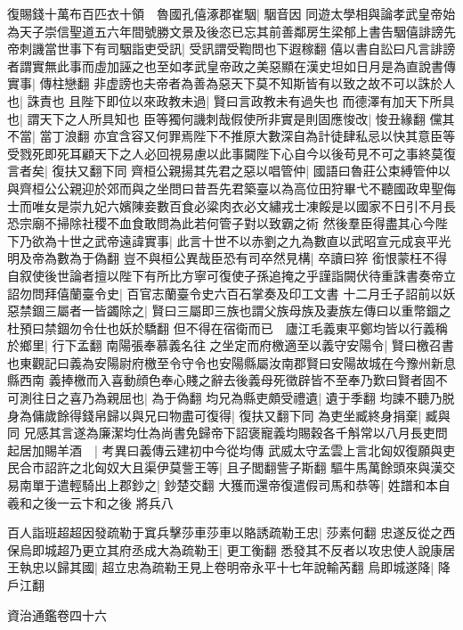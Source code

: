 復賜錢十萬布百匹衣十領　魯國孔僖涿郡崔駰|{
	駰音因}
同遊太學相與論孝武皇帝始為天子崇信聖道五六年間號勝文景及後恣已忘其前善鄰房生梁郁上書告駰僖誹謗先帝刺譏當世事下有司駰詣吏受訊|{
	受訊謂受鞫問也下遐稼翻}
僖以書自訟曰凡言誹謗者謂實無此事而虛加誣之也至如孝武皇帝政之美惡顯在漢史坦如日月是為直說書傳實事|{
	傳柱戀翻}
非虚謗也夫帝者為善為惡天下莫不知斯皆有以致之故不可以誅於人也|{
	誅責也}
且陛下即位以來政教未過|{
	賢曰言政教未有過失也}
而德澤有加天下所具也|{
	謂天下之人所具知也}
臣等獨何譏刺哉假使所非實是則固應悛改|{
	悛丑緣翻}
儻其不當|{
	當丁浪翻}
亦宜含容又何罪焉陛下不推原大數深自為計徒肆私忌以快其意臣等受戮死即死耳顧天下之人必回視易慮以此事闚陛下心自今以後苟見不可之事終莫復言者矣|{
	復扶又翻下同}
齊桓公親揚其先君之惡以唱管仲|{
	國語曰魯莊公束縛管仲以與齊桓公公親迎於郊而與之坐問曰昔吾先君築臺以為高位田狩畢弋不聽國政卑聖侮士而唯女是崇九妃六嬪陳妾數百食必粱肉衣必文繡戎士凍餒是以國家不日引不月長恐宗廟不掃除社稷不血食敢問為此若何管子對以致霸之術}
然後羣臣得盡其心今陛下乃欲為十世之武帝遠諱實事|{
	此言十世不以赤劉之九為數直以武昭宣元成哀平光明及帝為數為于偽翻}
豈不與桓公異哉臣恐有司卒然見構|{
	卒讀曰猝}
銜恨蒙枉不得自叙使後世論者擅以陛下有所比方寧可復使子孫追掩之乎謹詣闕伏待重誅書奏帝立詔勿問拜僖蘭臺令史|{
	百官志蘭臺令史六百石掌奏及印工文書}
十二月壬子詔前以妖惡禁錮三屬者一皆蠲除之|{
	賢曰三屬即三族也謂父族母族及妻族左傳曰以重幣錮之杜預曰禁錮勿令仕也妖於驕翻}
但不得在宿衛而已　廬江毛義東平鄭均皆以行義稱於鄉里|{
	行下孟翻}
南陽張奉慕義名往之坐定而府檄適至以義守安陽令|{
	賢曰檄召書也東觀記曰義為安陽尉府檄至令守令也安陽縣屬汝南郡賢曰安陽故城在今豫州新息縣西南}
義捧檄而入喜動顔色奉心賤之辭去後義母死徵辟皆不至奉乃歎曰賢者固不可測往日之喜乃為親屈也|{
	為于偽翻}
均兄為縣吏頗受禮遺|{
	遺于季翻}
均諫不聽乃脱身為傭歲餘得錢帛歸以與兄曰物盡可復得|{
	復扶又翻下同}
為吏坐臧終身捐棄|{
	臧與同}
兄感其言遂為廉潔均仕為尚書免歸帝下詔褒寵義均賜穀各千斛常以八月長吏問起居加賜羊酒　|{
	考異曰義傳云建初中今從均傳}
武威太守孟雲上言北匈奴復願與吏民合市詔許之北匈奴大且渠伊莫訾王等|{
	且子閭翻訾子斯翻}
驅牛馬萬餘頭來與漢交易南單于遣輕騎出上郡鈔之|{
	鈔楚交翻}
大獲而還帝復遣假司馬和恭等|{
	姓譜和本自羲和之後一云卞和之後}
將兵八

百人詣班超超因發疏勒于窴兵擊莎車莎車以賂誘疏勒王忠|{
	莎素何翻}
忠遂反從之西保烏即城超乃更立其府丞成大為疏勒王|{
	更工衡翻}
悉發其不反者以攻忠使人說康居王執忠以歸其國|{
	超立忠為疏勒王見上卷明帝永平十七年說輸芮翻}
烏即城遂降|{
	降戶江翻}


資治通鑑卷四十六

